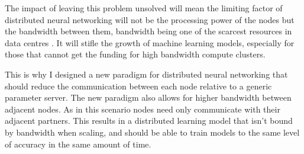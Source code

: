 \par
The impact of leaving this problem unsolved will mean the limiting factor of
distributed neural networking will not be the processing power of the nodes but
the bandwidth between them, bandwidth being one of the scarcest resources in
data centres \cite{LuizDatacenterAsAComputer}. It will stifle the growth of
machine learning models, especially for those that cannot get the funding for high
bandwidth compute clusters.

This is why I designed a new paradigm for distributed neural networking that
should reduce the communication between each node relative to a generic
parameter server. The new paradigm also allows for higher bandwidth between
adjacent nodes. As in this scenario nodes need only communicate with their
adjacent partners. This results in a distributed learning model that isn't bound
by bandwidth when scaling, and should be able to train models to the same level
of accuracy in the same amount of time.


